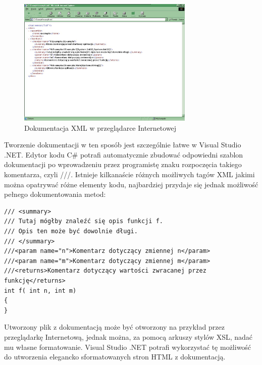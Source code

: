 \begin{figure}
\begin{center}
\includegraphics[width=0.75\textwidth]{./pic/w04}
\caption{Dokumentacja XML w przeglądarce Internetowej}
\end{center}
\end{figure}

Tworzenie dokumentacji w ten sposób jest szczególnie łatwe w Visual Studio .NET. Edytor kodu C\#
potrafi automatycznie zbudować odpowiedni szablon dokumentacji po wprowadzeniu przez programistę
znaku rozpoczęcia takiego komentarza, czyli ///. 
Istnieje kilkanaście różnych możliwych 
tagów XML jakimi można opatrywać różne elementy kodu, najbardziej przydaje się jednak możliwość pełnego
dokumentowania metod:

\begin{scriptsize}
\begin{verbatim}
/// <summary>
/// Tutaj mógłby znaleźć się opis funkcji f.
/// Opis ten może być dowolnie długi.
/// </summary> 
///<param name="n">Komentarz dotyczący zmiennej n</param>
///<param name="m">Komentarz dotyczący zmiennej m</param>
///<returns>Komentarz dotyczący wartości zwracanej przez funkcję</returns>
int f( int n, int m)
{
}
\end{verbatim}
\end{scriptsize}

Utworzony plik z dokumentacją może być otworzony na przykład przez przeglądarkę Internetową, jednak
można, za pomocą arkuszy stylów XSL, nadać mu własne formatowanie. Visual Studio .NET potrafi wykorzystać
tę możliwość do utworzenia elegancko sformatowanych stron HTML z dokumentacją.

